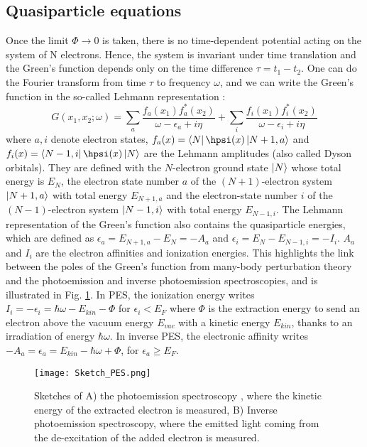 %
\subsection{Quasiparticle equations}
Once the limit $\Phi \to 0$ is taken, there is no time-dependent potential acting on the system of N electrons. Hence, the system is invariant under time translation and the Green's function depends only on the time difference $\tau = t_1 - t_2$. One can do the Fourier transform from time $\tau$ to frequency $\omega$, and we can write the Green's function in the so-called Lehmann representation :
\begin{equation}
	G(x_1,x_2;\omega) = \sum_a \frac{f_a(x_1)f_a^*(x_2)}{\omega-\epsilon_a + i\eta} + \sum_i \frac{f_i(x_1)f_i^*(x_2)}{\omega-\epsilon_i + i\eta}
\end{equation}
where $a,i$ denote electron states, $f_a(x) = \bra{N}\hpsi(x)\ket{N+1,a}$ and \\ $f_i(x) = \bra{N-1,i} \hpsi(x) \ket{N}$ are the Lehmann amplitudes (also called Dyson orbitals). They are defined with the $N$-electron ground state $\ket{N}$ whose total energy is $E_N$, the electron state number $a$ of the $(N+1)$-electron system $\ket{N+1,a}$ with total energy $E_{N+1,a}$ and the electron-state number $i$ of the $(N-1)$-electron system $\ket{N-1,i}$ with total energy $E_{N-1,i}$.
The Lehmann representation of the Green's function also contains the quasiparticle energies, which are defined as $\epsilon_a = E_{N+1,a} - E_N = -A_a$ and $\epsilon_i = E_N - E_{N-1,i} = -I_i$. $A_a$ and $I_i$ are the electron affinities and ionization energies. This highlights the link between the poles of the Green's function from many-body perturbation theory and the photoemission and inverse photoemission spectroscopies, and is illustrated in Fig. \ref{fig:sketch_PES}. In PES, the ionization energy writes $I_i = -\epsilon_i = \hbar \omega - E_{kin} - \Phi$ for $\epsilon_i < E_F$ where $\Phi$ is the extraction energy to send an electron above the vacuum energy $E_{vac}$ with a kinetic energy $E_{kin}$, thanks to an irradiation of energy $\hbar \omega$. In inverse PES, the electronic affinity writes $-A_a = \epsilon_a = E_{kin} - \hbar \omega + \Phi$, for $\epsilon_a \geq E_F$.
\begin{figure}[h!tbp]
	\vspace{0.5cm}
	\setcapindent{2em}
	\centering
	\texttt{[image: Sketch\_PES.png]}
	\caption{Sketches of A) the photoemission spectroscopy , where the kinetic energy of the extracted electron is measured, B) Inverse photoemission spectroscopy, where the emitted light coming from the de-excitation of the added electron is measured. }
	\label{fig:sketch_PES}
\end{figure}

